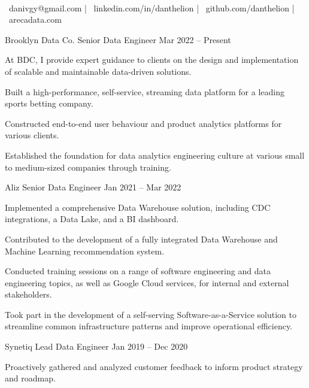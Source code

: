 \documentclass[]{awesome-cv}
\begin{document}
    
\begin{center}
	  \\
	\vspace{2mm}
	{\faEnvelope\ danivgy@gmail.com} | {\faLink\ linkedin.com/in/danthelion} | {\faLink\ github.com/danthelion} | {\faLink\ arecadata.com}
\end{center}
\begin{cventries}
	\cventry
	{Brooklyn Data Co.}
	{Senior Data Engineer}
	{Mar 2022 – Present}
	{}
	{\begin{cvitems}
		\item {At BDC, I provide expert guidance to clients on the design and implementation of scalable and maintainable data-driven solutions.}
		\item {Built a high-performance, self-service, streaming data platform for a leading sports betting company.}
		\item {Constructed end-to-end user behaviour and product analytics platforms for various clients.}
		\item {Established the foundation for data analytics engineering culture at various small to medium-sized companies through training.}
		\end{cvitems}}
	\cventry
	{Aliz}
	{Senior Data Engineer}
	{Jan 2021 – Mar 2022}
	{}
	{\begin{cvitems}
		\item {Implemented a comprehensive Data Warehouse solution, including CDC integrations, a Data Lake, and a BI dashboard.}
		\item {Contributed to the development of a fully integrated Data Warehouse and Machine Learning recommendation system.}
		\item {Conducted training sessions on a range of software engineering and data engineering topics, as well as Google Cloud services, for internal and external stakeholders.}
		\item {Took part in the development of a self-serving Software-as-a-Service solution to streamline common infrastructure patterns and improve operational efficiency.}
		\end{cvitems}}
	\cventry
	{Synetiq}
	{Lead Data Engineer}
	{Jan 2019 – Dec 2020}
	{}
	{\begin{cvitems}
		\item {Proactively gathered and analyzed customer feedback to inform product strategy and roadmap.}

\end{cvitems}}
\end{cventries}
\end{document}
